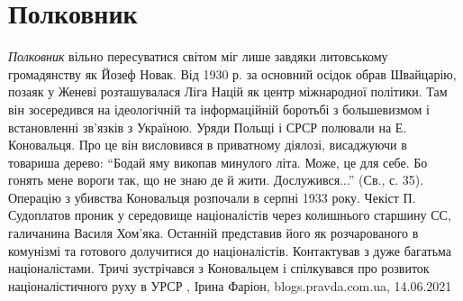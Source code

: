  
 
 
 
 
\chapter{Полковник}
\label{sec:slova.polkovnik}

\emph{Полковник} вільно пересуватися світом міг лише завдяки литовському громадянству
як Йозеф Новак. Від 1930 р. за основний осідок обрав Швайцарію, позаяк у Женеві
розташувалася Ліга Націй як центр міжнародної політики. Там він зосередився на
ідеологічній та інформаційній боротьбі з большевизмом і встановленні зв'язків з
Україною. Уряди Польщі і СРСР полювали на Е. Коновальця. Про це він висловився
в приватному діялозі, висаджуючи в товариша дерево: \enquote{Бодай яму викопав минулого
літа. Може, це для себе. Бо гонять мене вороги так, що не знаю де й жити.
Дослужився...} (Св., с. 35).
Операцію з убивства Коновальця розпочали в серпні 1933 року. Чекіст П.
Судоплатов проник у середовище націоналістів через колишнього старшину СС,
галичанина Василя Хом'яка. Останній представив його як розчарованого в
комунізмі та готового долучитися до націоналістів. Контактував з дуже багатьма
націоналістами. Тричі зустрічався з Коновальцем і спілкувався про розвиток
націоналістичного руху в УРСР
, 
Ірина Фаріон, blogs.pravda.com.ua, 14.06.2021
